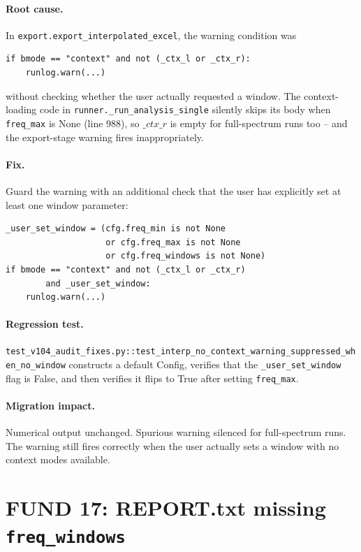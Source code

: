\documentclass[10pt,a4paper,twoside]{article}
\newcommand{\fn}[1]{\texttt{#1}}
\newcommand{\cfgkey}[1]{\texttt{#1}}
\begin{document}
\paragraph{Root cause.}
In \fn{export.export\_interpolated\_excel}, the warning condition
was
\begin{verbatim}
if bmode == "context" and not (_ctx_l or _ctx_r):
    runlog.warn(...)
\end{verbatim}
without checking whether the user actually requested a window.
The context-loading code in \fn{runner.\_run\_analysis\_single}
silently skips its body when \cfgkey{freq\_max} is None (line
988), so $\_ctx\_r$ is empty for full-spectrum runs too -- and
the export-stage warning fires inappropriately.

\paragraph{Fix.}
Guard the warning with an additional check that the user has
explicitly set at least one window parameter:
\begin{verbatim}
_user_set_window = (cfg.freq_min is not None
                    or cfg.freq_max is not None
                    or cfg.freq_windows is not None)
if bmode == "context" and not (_ctx_l or _ctx_r)
        and _user_set_window:
    runlog.warn(...)
\end{verbatim}

\paragraph{Regression test.}
\fn{test\_v104\_audit\_fixes.py::test\_interp\_no\_context\_warning\_suppressed\_when\_no\_window}
constructs a default Config, verifies that the
\texttt{\_user\_set\_window} flag is False, and then verifies it
flips to True after setting \cfgkey{freq\_max}.

\paragraph{Migration impact.}
Numerical output unchanged. Spurious warning silenced for
full-spectrum runs. The warning still fires correctly when the
user actually sets a window with no context modes available.

\section{FUND 17: REPORT.txt missing \cfgkey{freq\_windows}}
\label{sec:fund-17}
\end{document}
